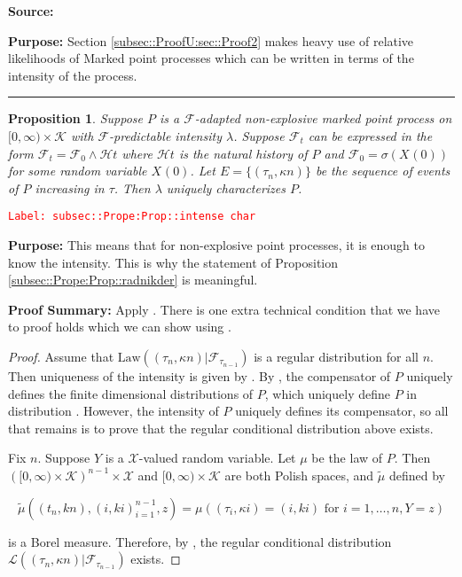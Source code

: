\documentclass[12pt]{article}
\newcommand{\mc}{\mathcal}
\newcommand{\ms}{\mathscr}
\newcommand{\te}{\text}
\newcommand{\tr}{\textcolor{red}}
\newcommand{\labe}[1]{\tr{\texttt{Label: #1}}}
\newcommand{\purpose}{\textbf{Purpose: }}
\newcommand{\pfsum}{\textbf{Proof Summary: }}
\newcommand{\ind}{\hspace{24pt}}
\newcommand{\lin}{\rule{\linewidth}{0.4 pt}}
\renewcommand{\t}{t}							%
\newcommand{\F}{\mc{F}}							%
\newcommand{\FH}{\mc{H}}						%
\newcommand{\X}{X}								%
\newcommand{\cind}[1]{_{#1}}					%
\newcommand{\tp}[1]{(#1)}						%
\newcommand{\ts}[1]{_{#1}}						%
\newcommand{\rate}{\lambda}						%
\newcommand{\alt}[1]{\widetilde{#1}}			%
\newcommand{\indx}[1]{_{#1}}					%
\newcommand{\m}{\mu}							%
\newcommand{\law}{\te{Law}}						%
\newcommand{\XX}{Y}								%
\newcommand{\rt}{\tau}							%
\renewcommand{\mark}{\kappa}					%
\newcommand{\rp}{P}								%
\newcommand{\spce}{\mc{X}}						%
\newcommand{\xxx}{z}							%
\newcommand{\mspce}{\mc{K}}						%
\newtheorem{prop}[thms]{Proposition}
\begin{document}
\textbf{Source: }\cite[Definition 14.3.I]{DalVer08}

\purpose Section \ref{subsec::ProofU:sec::Proof2} makes heavy use of relative likelihoods of Marked point processes which can be written in terms of the intensity of the process.

\lin

\begin{prop}
Suppose \(\rp\) is a \(\F\)-adapted non-explosive marked point process on \([0,\infty)\times \mspce\) with \(\F\)-predictable intensity \(\rate\). Suppose \(\F\ts{\t}\) can be expressed in the form \(\F\ts{\t} = \F\ts{0}\wedge \FH{\t}\) where \(\FH{\t}\) is the natural history of \(\rp\) and \(\F\ts{0} = \sigma(\X\cind{}\tp{0})\) for some random variable \(\X\cind{}\tp{0}\). Let \(E = \{(\rt\indx{n},\mark{n})\}\) be the sequence of events of \(\rp\) increasing in \(\rt\). Then \(\rate\) uniquely characterizes \(\rp\).
\label{subsec::Prope:Prop::intense char}
\end{prop}
\labe{subsec::Prope:Prop::intense char}

\purpose This means that for non-explosive point processes, it is enough to know the intensity. This is why the statement of Proposition \ref{subsec::Prope:Prop::radnikder} is meaningful.

\pfsum Apply \cite[Propositions 14.3.II(b),14.2.IV(c) and 9.2.III]{DalVer08}. There is one extra technical condition that we have to proof holds which we can show using \cite[Proposition A1.5.III]{DalVer03}.

\begin{proof}
Assume that \(\law((\rt\indx{n},\mark{n})|\F\ts{\rt\indx{n-1}})\) is a regular distribution for all \(n\). Then uniqueness of the intensity is given by \cite[Proposition 14.3.II (b)]{DalVer08}. By \cite[Proposition 14.2.IV (c)]{DalVer08}, the compensator of \(\rp\) uniquely defines the finite dimensional distributions of \(\rp\), which uniquely define \(\rp\) in distribution \cite[Proposition 9.2.III]{DalVer08}. However, the intensity of \(\rp\) uniquely defines its compensator, so all that remains is to prove that the regular conditional distribution above exists.

\ind Fix \(n\). Suppose \(\XX\) is a \(\spce\)-valued random variable. Let \(\m\) be the law of \(\rp\). Then \(\left([0,\infty)\times \mspce\right)^{n-1}\times\spce\) and \([0,\infty)\times \mspce\) are both Polish spaces, and \(\alt{\m}\) defined by 

\[\alt{\m}((\t\indx{n},k{n}),(	{i},k{i})_{i=1}^{n-1},\xxx) = \m\left((\rt\indx{i},\mark{i}) = (	{i},k{i})\te{ for } i=1,\dots,n, \XX = \xxx\right)\]

is a Borel measure. Therefore, by \cite[Proposition A1.5.III]{DalVer03}, the regular conditional distribution \(\ms{L}((\rt\indx{n},\mark{n})|\F\ts{\rt\indx{n-1}})\) exists.
\end{proof}
\end{document}

